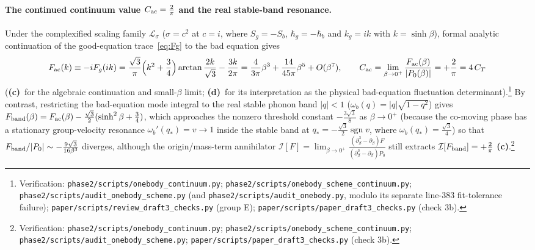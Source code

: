 \documentclass[11pt,a4paper]{article}
\newcommand{\lab}[1]{{\normalfont\sffamily\footnotesize\bfseries(#1)}}
\newcommand{\Lc}{\lab{c}}
\newcommand{\Ld}{\lab{d}}
\newcommand{\scr}[1]{\nolinkurl{#1}}
\newcommand{\chk}[1]{\footnote{\raggedright Verification: #1.}}
\newcommand{\hb}{\hbar}
\newcommand{\sgn}{\operatorname{sgn}}
\theoremstyle{remark}
\begin{document}
\paragraph{The continued continuum value $C_{\rm ac}=\tfrac2\pi$ and the real stable-band resonance.} Under the complexified scaling family $\mathcal L_\sigma$ ($\sigma=c^2$ at $c=i$, where $S_g=-S_b$, $\hb_g=-\hb_b$ and $k_g=ik$ with $k=\sinh\beta$), formal analytic continuation of the good-equation trace~\eqref{eq:Fg} to the bad equation gives
\begin{equation}\label{eq:Fac}
F_{\rm ac}(k)\equiv -iF_g(ik)
=\frac{\sqrt3}{\pi}\Big(k^2+\frac34\Big)\arctan\frac{2k}{\sqrt3}-\frac{3k}{2\pi}
=\frac4{3\pi}\beta^3+\frac{14}{45\pi}\beta^5+O(\beta^7),\qquad
C_{\rm ac}=\lim_{\beta\to0^+}\frac{F_{\rm ac}(\beta)}{|P_0(\beta)|}=+\frac2\pi=4\,C_T
\end{equation}
(\Lc\ for the algebraic continuation and small-$\beta$ limit; \Ld\ for its interpretation as the physical bad-equation fluctuation determinant).\chk{\scr{phase2/scripts/onebody_continuum.py}; \scr{phase2/scripts/onebody_scheme_continuum.py}; \scr{phase2/scripts/audit_onebody_scheme.py} (and \scr{phase2/scripts/audit_onebody.py}, modulo its separate line-383 fit-tolerance failure); \scr{paper/scripts/review_draft3_checks.py} (group E); \scr{paper/scripts/paper_draft3_checks.py} (check 3b)}
By contrast, restricting the bad-equation mode integral to the real stable phonon band $|q|<1$ ($\omega_b(q)=|q|\sqrt{1-q^2}$) gives $F_{\rm band}(\beta)=F_{\rm ac}(\beta)-\frac{\sqrt3}2(\sinh^2\beta+\tfrac34)$, which approaches the nonzero threshold constant $-\frac{3\sqrt3}8$ as $\beta\to0^+$ (because the co-moving phase has a stationary group-velocity resonance $\omega_b'(q_*)=v\to1$ inside the stable band at $q_*=-\frac{\sqrt3}2\sgn v$, where $\omega_b(q_*)=\frac{\sqrt3}4$) so that $F_{\rm band}/|P_0|\sim-\frac{9\sqrt3}{16\beta^3}$ diverges, although the origin/mass-term annihilator $\mathcal I[F]=\lim_{\beta\to0^+}\frac{(\partial_\beta^3-\partial_\beta)F}{(\partial_\beta^3-\partial_\beta)P_0}$ still extracts $\mathcal I[F_{\rm band}]=+\frac2\pi$ \Lc.\chk{\scr{phase2/scripts/onebody_continuum.py}; \scr{phase2/scripts/onebody_scheme_continuum.py}; \scr{phase2/scripts/audit_onebody_scheme.py}; \scr{paper/scripts/paper_draft3_checks.py} (check 3b)}
\end{document}
